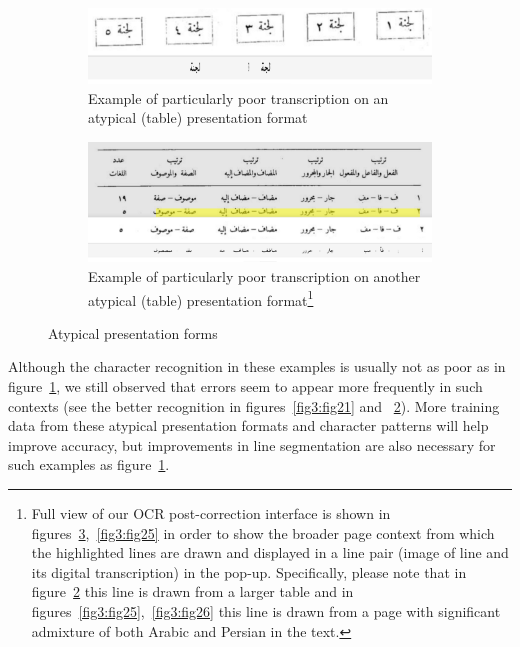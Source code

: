 \begin{figure}[!ht]
	\begin{subfigure}[b]{0.9\linewidth}
	\centering
	\includegraphics[width=\textwidth]{images/image10.png}
	\caption{Example of particularly poor transcription on an atypical (table) presentation format}
	\label{fig3:fig23}
	\end{subfigure}

	\begin{subfigure}[b]{0.9\linewidth}
	\centering
	\includegraphics[width=\textwidth]{images/image11.png}
	\caption{Example of particularly poor transcription on another atypical
(table) presentation format\footnote{Full view of our OCR post-correction
interface is shown in figures~\ref{fig3:fig2124},~\ref{fig3:fig25} in order to
show the broader page context from which the highlighted lines are drawn and
displayed in a line pair (image of line and its digital transcription) in the
pop-up. Specifically, please note that in figure~\ref{fig3:fig24} this line is
drawn from a larger table and in figures~\ref{fig3:fig25},~\ref{fig3:fig26} this line is
drawn from a page with significant admixture of both Arabic and Persian in the
text.}}
	\label{fig3:fig24}
	\end{subfigure}
	\caption{Atypical presentation forms}
	\label{fig3:fig2124}
\end{figure}

Although the character recognition in these examples is usually not as poor as
in figure~\ref{fig3:fig23}, we still observed that errors seem to appear more
frequently in such contexts (see the better recognition in
figures~\ref{fig3:fig21} and ~\ref{fig3:fig24}). More training data from these
atypical presentation formats and character patterns will help improve
accuracy, but improvements in line segmentation are also necessary for such
examples as figure~\ref{fig3:fig23}.

